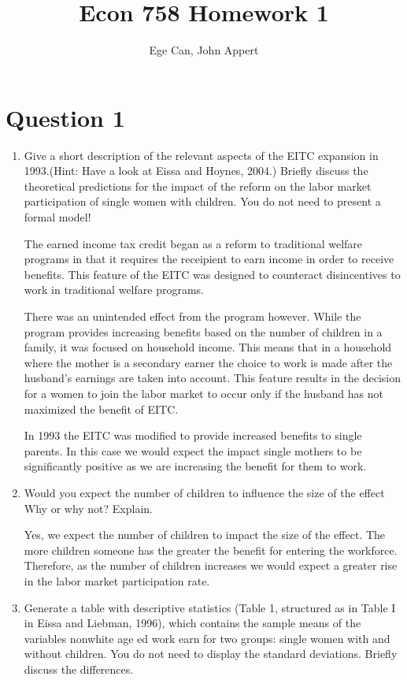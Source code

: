 \documentclass{article}
\begin{document}
\title{Econ 758 Homework 1}
\author{Ege Can, John Appert}
\maketitle

\section{Question 1}

\begin{enumerate}[label=\alph*]
\item Give a short description of the relevant aspects of the EITC expansion in 1993.(Hint: Have a look at Eissa and Hoynes, 2004.) Briefly discuss the theoretical predictions for the impact of the reform on the labor market participation of  single women with children. You do  not need  to present a formal model!

The earned income tax credit began as a reform to traditional welfare programs in that it requires the receipient to earn income in order to receive benefits.  This feature of the EITC was designed to counteract disincentives to work in traditional welfare programs.

There was an unintended effect from the program however.  While the program provides increasing benefits based on the number of children in a family, it was focused on household income.  This means that in a household where the mother is a secondary earner the choice to work is made after the husband's earnings are taken into account.  This feature results in the decision for a women to join the labor market to occur only if the husband has not maximized the benefit of EITC.  

In 1993 the EITC was modified to provide increased benefits to single parents.  In this case we would expect the impact single mothers to be significantly positive as we are increasing the benefit for them to work.

\item Would you expect the number of children to influence the size of the effect Why or why not? Explain.

Yes, we expect the number of children to impact the size of the effect.  The more children someone has the greater the benefit for entering the workforce.  Therefore, as the number of children increases we would expect a greater rise in the labor market participation rate.

\item  Generate a table with descriptive statistics (Table 1, structured as in Table I in Eissa and Liebman, 1996), which contains the sample means of the variables nonwhite age ed work  earn  for  two groups: single women with and without children. You do not need to display the  standard deviations. Briefly discuss the differences.


\end{enumerate}
\end{document}
